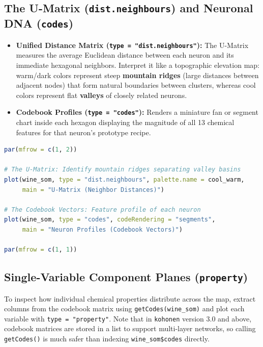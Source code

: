 \documentclass[11pt]{article}
\begin{document}
\subsection{The U-Matrix (\texttt{dist.neighbours}) and Neuronal DNA (\texttt{codes})}
\begin{itemize}
  \item \textbf{Unified Distance Matrix (\texttt{type = "dist.neighbours"}):} The U-Matrix measures the average Euclidean distance between each neuron and its immediate hexagonal neighbors. Interpret it like a topographic elevation map: warm/dark colors represent steep \textbf{mountain ridges} (large distances between adjacent nodes) that form natural boundaries between clusters, whereas cool colors represent flat \textbf{valleys} of closely related neurons.
  \item \textbf{Codebook Profiles (\texttt{type = "codes"}):} Renders a miniature fan or segment chart inside each hexagon displaying the magnitude of all 13 chemical features for that neuron's prototype recipe.
\end{itemize}

\begin{lstlisting}[language=R]
par(mfrow = c(1, 2))

# The U-Matrix: Identify mountain ridges separating valley basins
plot(wine_som, type = "dist.neighbours", palette.name = cool_warm,
     main = "U-Matrix (Neighbor Distances)")

# The Codebook Vectors: Feature profile of each neuron
plot(wine_som, type = "codes", codeRendering = "segments",
     main = "Neuron Profiles (Codebook Vectors)")

par(mfrow = c(1, 1))
\end{lstlisting}

\subsection{Single-Variable Component Planes (\texttt{property})}
To inspect how individual chemical properties distribute across the map, extract columns from the codebook matrix using \texttt{getCodes(wine\_som)} and plot each variable with \texttt{type = "property"}. Note that in \texttt{kohonen} version 3.0 and above, codebook matrices are stored in a list to support multi-layer networks, so calling \texttt{getCodes()} is much safer than indexing \texttt{wine\_som\$codes} directly.
\end{document}
